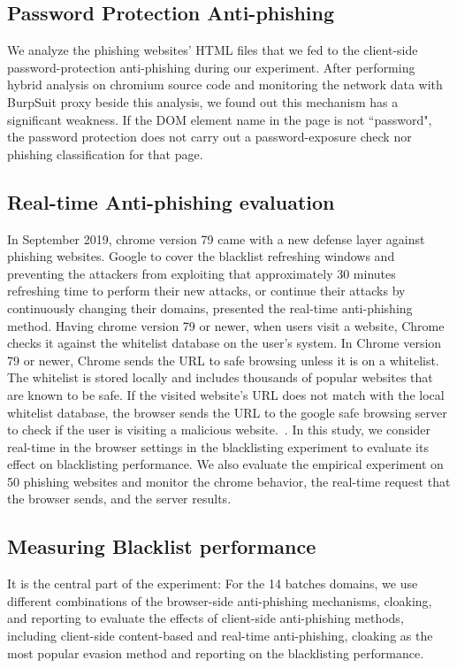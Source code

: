 \subsection{Password Protection Anti-phishing}
We analyze the phishing websites' HTML files that we fed to the client-side password-protection anti-phishing during our experiment. After performing hybrid analysis on chromium source code and monitoring the network data with BurpSuit proxy beside this analysis, we found out this mechanism has a significant weakness. If the DOM element name in the page is not ``password", the password protection does not carry out a password-exposure check nor phishing classification for that page.  
\subsection{Real-time Anti-phishing evaluation}

In September 2019, chrome version 79 came with a new defense layer against phishing websites. Google to cover the blacklist refreshing windows and preventing the attackers from exploiting that approximately 30 minutes refreshing time to perform their new attacks, or continue their attacks by continuously changing their domains, presented the real-time anti-phishing method.
Having chrome version 79 or newer, when users visit a website, Chrome checks it against the whitelist database on the user's system. 
In Chrome version 79 or newer, Chrome sends the URL to safe browsing unless it is on a whitelist. The whitelist is stored locally and includes thousands of popular websites that are known to be safe. If the visited website's URL does not match with the local whitelist database, the browser sends the URL to the google safe browsing server to check if the user is visiting a malicious website.~\cite{gsbapi,googlechromeprivacywhitepaper}. 
In this study, we consider real-time in the browser settings in the blacklisting experiment to evaluate its effect on blacklisting performance.
We also evaluate the empirical experiment on 50 phishing websites and monitor the chrome behavior, the real-time request that the browser sends, and the server results.

\subsection{Measuring Blacklist performance}
It is the central part of the experiment:
For the 14 batches domains, we use different combinations of the browser-side anti-phishing mechanisms, cloaking, and reporting to evaluate the effects of client-side anti-phishing methods, including client-side content-based and real-time anti-phishing, cloaking as the most popular evasion method and reporting on the blacklisting performance.

